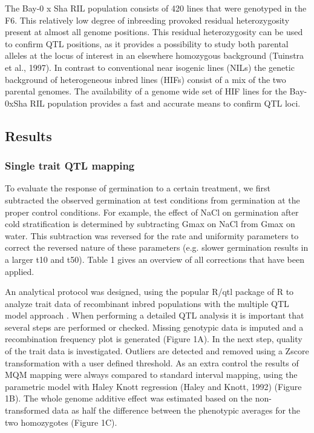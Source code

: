 The Bay-0 x Sha RIL population consists of 420 lines that were genotyped in the F6. This relatively 
low degree of inbreeding provoked residual heterozygosity present at almost all genome positions. 
This residual heterozygosity can be used to confirm QTL positions, as it provides a possibility to 
study both parental alleles at the locus of interest in an elsewhere homozygous background (Tuinstra 
et al., 1997). In contrast to conventional near isogenic lines (NILs) the genetic background of 
heterogeneous inbred lines (HIFs) consist of a mix of the two parental genomes. The availability 
of a genome wide set of HIF lines for the Bay-0xSha RIL population provides a fast and accurate means 
to confirm QTL loci.

\subsection{Results}

\subsubsection{Single trait QTL mapping}
To evaluate the response of germination to a certain treatment, we first subtracted the observed 
germination at test conditions from germination at the proper control conditions. For example, the 
effect of NaCl on germination after cold stratification is determined by subtracting Gmax on 
NaCl from Gmax on water. This subtraction was reversed for the rate and uniformity parameters to 
correct the reversed nature of these parameters (e.g. slower germination results in a larger t10 
and t50). Table 1 gives an overview of all corrections that have been applied. 

An analytical protocol was designed, using the popular R/qtl package of R to analyze trait data of 
recombinant inbred populations with the multiple QTL model approach \cite{Arends:2010}. When 
performing a detailed QTL analysis it is important that several steps are performed or checked. 
Missing genotypic data is imputed and a recombination frequency plot is generated (Figure 1A). In 
the next step, quality of the trait data is investigated. Outliers are detected and removed using 
a Zscore transformation with a user defined threshold. As an extra control the results of MQM mapping 
were always compared to standard interval mapping, using the parametric model with Haley Knott 
regression (Haley and Knott, 1992) (Figure 1B). The whole genome additive effect was estimated based 
on the non-transformed data as half the difference between the phenotypic averages for the two 
homozygotes (Figure 1C).

